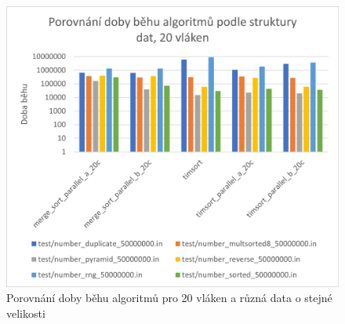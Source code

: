 \documentclass[thesis=B,czech]{FITthesis}[2019/12/23]
\begin{document}
\begin{figure}[htbp]\centering
	\includegraphics[width=13cm]{obrazky/graf32.png}
	\caption[Porovnání doby běhu algoritmů pro 20 vláken a různá data o stejné velikosti]{Porovnání doby běhu algoritmů pro 20 vláken a různá data o stejné velikosti}\label{fig:graf32}
\end{figure}
\end{document}
